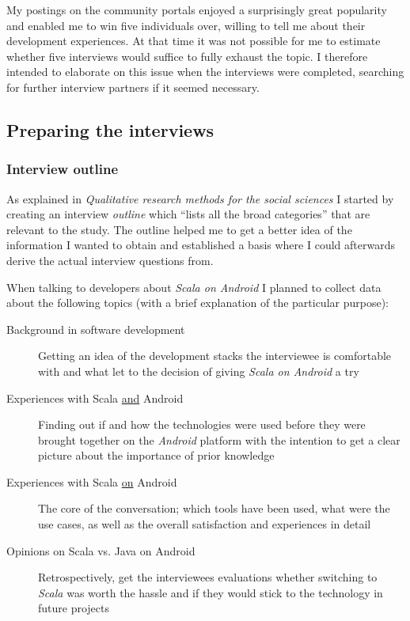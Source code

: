 My postings on the community portals enjoyed a surprisingly great popularity and enabled me to win five individuals over, willing to tell me about their development experiences. At that time it was not possible for me to estimate whether five interviews would suffice to fully exhaust the topic. I therefore intended to elaborate on this issue when the interviews were completed, searching for further interview partners if it seemed necessary.

\subsection{Preparing the interviews}

\subsubsection{Interview outline}

As explained in \textit{Qualitative research methods for the social sciences} I started by creating an interview \textit{outline} which \enquote{lists all the broad categories} \cite[p. 72]{berg01} that are relevant to the study. The outline helped me to get a better idea of the information I wanted to obtain and established a basis where I could afterwards derive the actual interview questions from.

When talking to developers about \textit{Scala on Android} I planned to collect data about the following topics (with a brief explanation of the particular purpose):

\begin{description}

	\item[Background in software development]\hfill

	Getting an idea of the development stacks the interviewee is comfortable with and what let to the decision of giving \textit{Scala on Android} a try

	\item[Experiences with Scala \underline{and} Android]\hfill

	Finding out if and how the technologies were used before they were brought together on the \textit{Android} platform with the intention to get a clear picture about the importance of prior knowledge

	\item[Experiences with Scala \underline{on} Android]\hfill

	The core of the conversation; which tools have been used, what were the use cases, as well as the overall satisfaction and experiences in detail

	\item[Opinions on Scala vs. Java on Android]\hfill

	Retrospectively, get the interviewees evaluations whether switching to \textit{Scala} was worth the hassle and if they would stick to the technology in future projects

\end{description}

